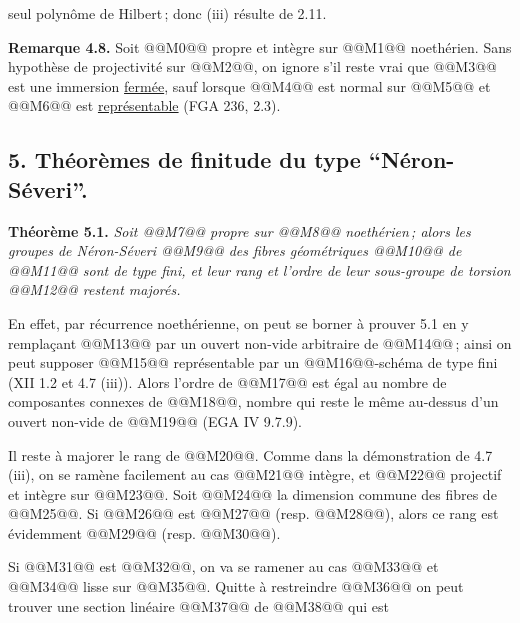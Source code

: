 
seul polyn\^ome de Hilbert\,; donc (iii) r\'esulte de 2.11.

\textbf{Remarque 4.8.} Soit @@M0@@ propre et int\`egre sur @@M1@@ noeth\'erien. Sans hypoth\`ese de projectivit\'e sur @@M2@@, on ignore s'il reste vrai que @@M3@@ est une immersion \uline{ferm\'ee}, sauf lorsque @@M4@@ est normal sur @@M5@@ et @@M6@@ est \uline{repr\'esentable} (FGA 236, 2.3).

\providecommand{\NS}{\operatorname{NS}}
\providecommand{\Picard}{\operatorname{Pic}}
\providecommand{\Et}{\mathrm{et}}
\providecommand{\rk}{\operatorname{rk}}
\providecommand{\im}{\operatorname{Im}}
\providecommand{\HH}{\mathrm H}


\subsection*{5. Th\'eor\`emes de finitude du type ``N\'eron-S\'everi''.}

\textbf{Th\'eor\`eme 5.1.} \emph{Soit @@M7@@ propre sur @@M8@@ noeth\'erien\,; alors les groupes de N\'eron-S\'everi @@M9@@ des fibres g\'eom\'etriques @@M10@@ de @@M11@@ sont de type fini, et leur rang et l'ordre de leur sous-groupe de torsion @@M12@@ restent major\'es.}

En effet, par r\'ecurrence noeth\'erienne, on peut se borner \`a prouver 5.1 en y rempla\c{c}ant @@M13@@ par un ouvert non-vide arbitraire de @@M14@@\,; ainsi on peut supposer @@M15@@ repr\'esentable par un @@M16@@-sch\'ema de type fini (XII 1.2 et 4.7 (iii)). Alors l'ordre de @@M17@@ est \'egal au nombre de composantes connexes de @@M18@@, nombre qui reste le m\^eme au-dessus d'un ouvert non-vide de @@M19@@ (EGA IV 9.7.9).

Il reste \`a majorer le rang de @@M20@@. Comme dans la d\'emonstration de 4.7 (iii), on se ram\`ene facilement au cas @@M21@@ int\`egre, et @@M22@@ projectif et int\`egre sur @@M23@@. Soit @@M24@@ la dimension commune des fibres de @@M25@@. Si @@M26@@ est @@M27@@ (resp. @@M28@@), alors ce rang est \'evidemment @@M29@@ (resp. @@M30@@).

Si @@M31@@ est @@M32@@, on va se ramener au cas @@M33@@ et @@M34@@ lisse sur @@M35@@. Quitte \`a restreindre @@M36@@ on peut trouver une section lin\'eaire @@M37@@ de @@M38@@ qui est
